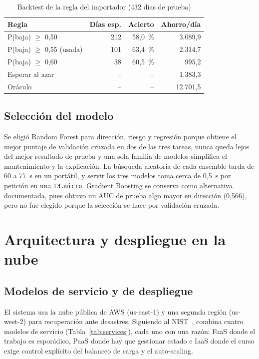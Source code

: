 \documentclass[conference]{IEEEtran}
\begin{document}
\begin{table}[t]
\caption{Backtest de la regla del importador (432 días de prueba)}
\label{tab:regla}
\centering
\footnotesize
\begin{tabular}{@{}lrrr@{}}
\toprule
Regla & Días esp. & Acierto & Ahorro/día \\
\midrule
P(baja) $\geq$ 0,50 & 212 & 58,0~\% & 3.089,9 \\
P(baja) $\geq$ 0,55 (usada) & 101 & 63,4~\% & 2.314,7 \\
P(baja) $\geq$ 0,60 & 38 & 60,5~\% & 995,2 \\
Esperar al azar & -- & -- & 1.383,3 \\
Oráculo & -- & -- & 12.701,5 \\
\bottomrule
\end{tabular}
\par\vspace{2pt}{\footnotesize Ahorro medio en COP por cada USD~1.000 al día.}
\end{table}

\subsection{Selección del modelo}
Se eligió Random Forest para dirección, riesgo y regresión porque obtiene el mejor puntaje de validación cruzada en dos de las tres tareas, nunca queda lejos del mejor resultado de prueba y una sola familia de modelos simplifica el mantenimiento y la explicación. La búsqueda aleatoria de cada ensemble tarda de 60 a 77~s en un portátil, y servir los tres modelos toma cerca de 0,5~s por petición en una \texttt{t3.micro}. Gradient Boosting se conserva como alternativa documentada, pues obtuvo un AUC de prueba algo mayor en dirección (0,566), pero no fue elegido porque la selección se hace por validación cruzada.

\section{Arquitectura y despliegue en la nube}
\subsection{Modelos de servicio y de despliegue}
El sistema usa la nube pública de AWS (us-east-1) y una segunda región (us-west-2) para recuperación ante desastres. Siguiendo al NIST~\cite{nist800145}, combina cuatro modelos de servicio (Tabla~\ref{tab:services}), cada uno con una razón: FaaS donde el trabajo es esporádico, PaaS donde hay que gestionar estado e IaaS donde el curso exige control explícito del balanceo de carga y el auto-scaling.
\end{document}
